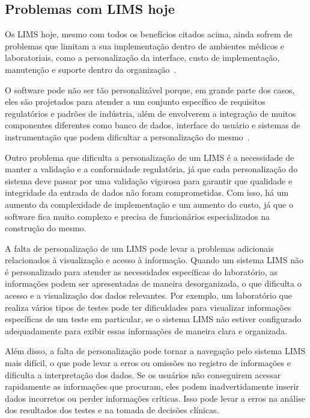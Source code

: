 \subsection{Problemas com LIMS hoje}


Os LIMS hoje, mesmo com todos os benefícios citados acima, ainda sofrem de problemas que limitam a sua implementação dentro de ambientes médicos e laboratoriais, como a personalização da interface, custo de implementação, manutenção e suporte dentro da organização~\cite{Avery2000ProductGuide., 2018CommonAstrix}.

O software pode não ser tão personalizável porque, em grande parte dos casos, eles são projetados para atender a um conjunto específico de requisitos regulatórios e padrões de indústria, além de envolverem a integração de muitos componentes diferentes como banco de dados, interface do usuário e sistemas de instrumentação que podem dificultar a personalização do mesmo~\cite{Tomlinson2022AOperations}.

Outro problema que dificulta a personalização de um LIMS é a necessidade de manter a validação e a conformidade regulatória, já que cada personalização do sistema deve passar por uma validação vigorosa para garantir que qualidade e integridade da entrada de dados não foram comprometidas.
Com isso, há um aumento da complexidade de implementação e um aumento do custo, já que o software fica muito complexo e precisa de funcionários especializados na construção do mesmo.



A falta de personalização de um LIMS pode levar a problemas adicionais relacionados à visualização e acesso à informação. Quando um sistema LIMS não é personalizado para atender as necessidades específicas do laboratório, as informações podem ser apresentadas de maneira desorganizada, o que dificulta o acesso e a visualização dos dados relevantes. Por exemplo, um laboratório que realiza vários tipos de testes pode ter dificuldades para visualizar informações específicas de um teste em particular, se o sistema LIMS não estiver configurado adequadamente para exibir essas informações de maneira clara e organizada.


Além disso, a falta de personalização pode tornar a navegação pelo sistema LIMS mais difícil, o que pode levar a erros ou omissões no registro de informações e dificulta a interpretação dos dados. Se os usuários não conseguirem acessar rapidamente as informações que procuram, eles podem inadvertidamente inserir dados incorretos ou perder informações críticas. Isso pode levar a erros na análise dos resultados dos testes e na tomada de decisões clínicas.

